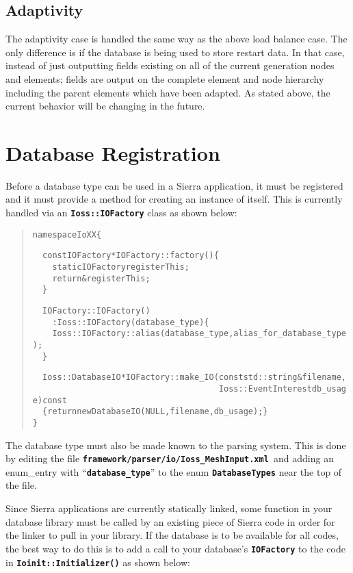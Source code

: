 \documentclass[11pt,twoside]{article}
\newcommand{\code}[1]
   {\mbox{\bf\tt #1}\null}
\newenvironment{source}
{\small\begin{quote}\begin{alltt}}
{\end{alltt}\end{quote}\normalsize}
\begin{document}
\subsection{Adaptivity}
The adaptivity case is handled the same way as the above load balance
case. The only difference is if the database is being used to store
restart data. In that case, instead of just outputting fields existing
on all of the current generation nodes and elements; fields are output
on the complete element and node hierarchy including the parent
elements which have been adapted. As stated above, the current behavior
will be changing in the future.

\section{Database Registration}
Before a database type can be used in a Sierra application, it must be
registered and it must provide a method for creating an instance of
itself. This is currently handled via an
\code{Ioss::IOFactory} class as shown below:

\begin{source}
 namespace IoXX \{
 
 \ \ const IOFactory* IOFactory::factory()\{
 \ \ \ \ static IOFactory registerThis;
 \ \ \ \ return \&registerThis;
 \ \ \}
 
 \ \ IOFactory::IOFactory()
 \ \ \ \ : Ioss::IOFactory({\textquotedbl}database\_type{\textquotedbl}) \{
 \ \ \ \ Ioss::IOFactory::alias({\textquotedbl}database\_type{\textquotedbl}, {\textquotedbl}alias\_for\_database\_type{\textquotedbl});
 \ \ \}
 
 \ \ Ioss::DatabaseIO* IOFactory::make\_IO(const std::string\& filename,
 \ \ \ \ \ \ \ \ \ \ \ \ \ \ \ \ \ \ \ \ \ \ \ \ \ \ \ \ \ \ \ \ \ \ \ \ \ \ Ioss::EventInterest db\_usage) const
 \ \ \{ return new DatabaseIO(NULL, filename, db\_usage); \}
 \}
\end{source}
The database type must also be made known to the parsing system. This is
done by editing the file
\code{framework/parser/io/Ioss\_MeshInput.xml }and adding an
enum\_entry with ``\code{database\_type}'' to the enum
\code{DatabaseTypes} near the top of the file.

Since Sierra applications are currently statically linked, some function
in your database library must be called by an existing piece of Sierra
code in order for the linker to pull in your library. If the database
is to be available for all codes, the best way to do this is to add a
call to your database's \code{IOFactory} to the code in
\code{Ioinit::Initializer()} as shown below:
\end{document}
